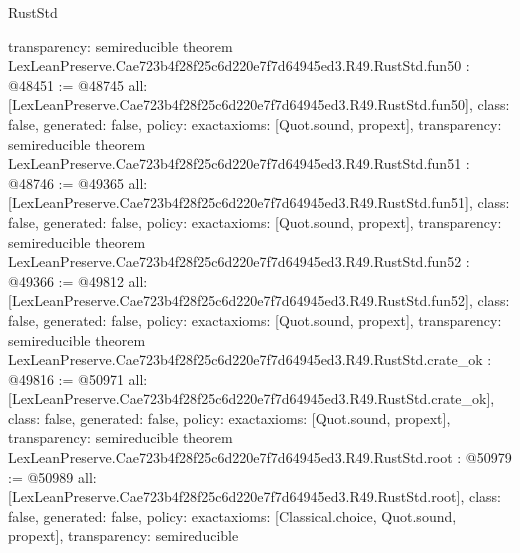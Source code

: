 \begin{lexlean}{RustStd}
\begin{coremodule}
{  transparency: semireducible
}
theorem LexLeanPreserve.Cae723b4f28f25c6d220e7f7d64945ed3.R49.RustStd.fun50 : @48451 := @48745 {
  all: [LexLeanPreserve.Cae723b4f28f25c6d220e7f7d64945ed3.R49.RustStd.fun50],
  class: false,
  generated: false,
  policy: exact{axioms: [Quot.sound, propext]},
  transparency: semireducible
}
theorem LexLeanPreserve.Cae723b4f28f25c6d220e7f7d64945ed3.R49.RustStd.fun51 : @48746 := @49365 {
  all: [LexLeanPreserve.Cae723b4f28f25c6d220e7f7d64945ed3.R49.RustStd.fun51],
  class: false,
  generated: false,
  policy: exact{axioms: [Quot.sound, propext]},
  transparency: semireducible
}
theorem LexLeanPreserve.Cae723b4f28f25c6d220e7f7d64945ed3.R49.RustStd.fun52 : @49366 := @49812 {
  all: [LexLeanPreserve.Cae723b4f28f25c6d220e7f7d64945ed3.R49.RustStd.fun52],
  class: false,
  generated: false,
  policy: exact{axioms: [Quot.sound, propext]},
  transparency: semireducible
}
theorem LexLeanPreserve.Cae723b4f28f25c6d220e7f7d64945ed3.R49.RustStd.crate_ok : @49816 := @50971 {
  all: [LexLeanPreserve.Cae723b4f28f25c6d220e7f7d64945ed3.R49.RustStd.crate_ok],
  class: false,
  generated: false,
  policy: exact{axioms: [Quot.sound, propext]},
  transparency: semireducible
}
theorem LexLeanPreserve.Cae723b4f28f25c6d220e7f7d64945ed3.R49.RustStd.root : @50979 := @50989 {
  all: [LexLeanPreserve.Cae723b4f28f25c6d220e7f7d64945ed3.R49.RustStd.root],
  class: false,
  generated: false,
  policy: exact{axioms: [Classical.choice, Quot.sound, propext]},
  transparency: semireducible
}


\end{coremodule}
\end{lexlean}
